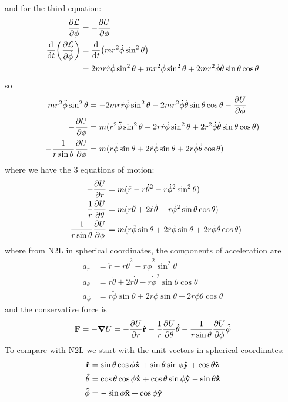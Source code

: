 \documentclass[../hw.tex]{subfiles}
\begin{document}
and for the third equation:
\begin{align*}
    \pdv{\mathcal{L}}{\phi} &= - \pdv{U}{\phi} \\
    \dv{t}(\pdv{\mathcal{L}}{\dot \phi}) &= \dv{t}(mr^2 \dot\phi \sin^2\theta) \\
    &= 2mr \dot r \dot\phi\sin^2\theta + mr^2 \ddot\phi \sin^2\theta + 2mr^2 \dot\phi \dot\theta \sin\theta \cos\theta
\end{align*}
so 
\begin{align*}
    mr^2 \ddot \phi \sin^2 \theta &= - 2mr \dot r \dot\phi\sin^2\theta
        - 2mr^2 \dot\phi \dot\theta \sin\theta \cos\theta - \pdv{U}{\phi} \\
    - \pdv{U}{\phi} &= m(r^2 \ddot\phi \sin^2\theta + 2r \dot r \dot\phi\sin^2\theta
        + 2r^2 \dot\phi \dot\theta \sin\theta \cos\theta) \\
    - \frac{1}{r\sin\theta} \pdv{U}{\phi} &= m(r\ddot\phi \sin\theta + 2\dot r \dot\phi \sin\theta
         + 2r \dot\phi \dot\theta \cos\theta)
\end{align*}
where we have the 3 equations of motion:
\begin{align*}
    -\pdv{U}{r} &= m (\ddot r - r \dot \theta^2 - r \dot \phi^2 \sin^2\theta) \\
    - \frac{1}{r} \pdv{U}{\theta} &= m (r\ddot \theta + 2 \dot r \dot \theta - r \dot\phi^2 \sin\theta \cos\theta) \\
    - \frac{1}{r\sin\theta} \pdv{U}{\phi} &= m(r\ddot\phi \sin\theta + 2\dot r \dot\phi \sin\theta
         + 2r \dot\phi \dot\theta \cos\theta)
\end{align*}
where from N2L in spherical coordinates, the components of acceleration are
\begin{align*}
    a_r &=  \ddot r - r \dot \theta^2 - r \dot \phi^2 \sin^2\theta \\
    a_\theta &= r\ddot \theta + 2 \dot r \dot \theta - r \dot\phi^2 \sin\theta \cos\theta \\
    a_\phi &= r\ddot\phi \sin\theta + 2\dot r \dot\phi \sin\theta
         + 2r \dot\phi \dot\theta \cos\theta
\end{align*}
and the conservative force is 
\begin{align*}
    \vb F = -\grad U = -\pdv{U}{r} \vu r - \frac{1}{r} \pdv{U}{\theta} \vu \theta - \frac{1}{r\sin\theta} \pdv{U}{\phi} \vu \phi   
\end{align*}
To compare with N2L we start with the unit vectors in spherical coordinates:
\begin{align*}
    \vu r &= \sin\theta \cos\phi \vu x + \sin\theta \sin\phi \vu y + \cos\theta \vu z \\
    \vu \theta &= \cos\theta \cos\phi \vu x + \cos\theta \sin\phi \vu y - \sin\theta \vu z \\
    \vu \phi &= -\sin\phi \vu x + \cos\phi \vu y
\end{align*}
\end{document}

